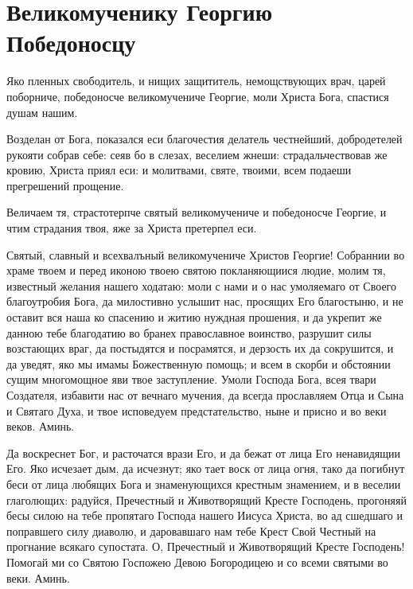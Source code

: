 \mychapterending{}


\section{Великомученику Георгию Победоносцу}\begin{mymulticols}
 
\ifpdf
  {\centering{}}
\else
\fi

Яко пленных свободитель, и нищих защититель, немощствующих врач, царей поборниче, победоносче великомучениче Георгие, моли Христа Бога, спастися душам нашим.


Возделан от Бога, показался еси благочестия делатель честнейший, добродетелей рукояти собрав себе: сеяв бо в слезах, веселием жнеши: страдальчествовав же кровию, Христа приял еси: и молитвами, святе, твоими, всем подаеши прегрешений прощение.


Величаем тя, страстотерпче святый великомучениче и победоносче Георгие, и чтим страдания твоя, яже за Христа претерпел еси.


Святый, славный и всехвалъный великомучениче Христов Георгие! Собраннии во храме твоем и перед иконою твоею святою покланяющиися людие, молим тя, известный желания нашего ходатаю: моли с нами и о нас умоляемаго от Своего благоутробия Бога, да милостивно услышит нас, просящих Его благостыню, и не оставит вся наша ко спасению и житию нуждная прошения, и да укрепит же данною тебе благодатию во бранех православное воинство, разрушит силы возстающих враг, да постыдятся и посрамятся, и дерзость их да сокрушится, и да уведят, яко мы имамы Божественную помощь; и всем в скорби и обстоянии сущим многомощное яви твое заступление. Умоли Господа Бога, всея твари Создателя, избавити нас от вечнаго мучения, да всегда прославляем Отца и Сына и Святаго Духа, и твое исповедуем предстательство, ныне и присно и во веки веков. Аминь.

Да воскреснет Бог, и расточатся врази Его, и да бежат от лица Его ненавидящии Его. Яко исчезает дым, да исчезнут; яко тает воск от лица огня, тако да погибнут беси от лица любящих Бога и знаменующихся крестным знамением, и в веселии глаголющих: радуйся, Пречестный и Животворящий Кресте Господень, прогоняяй бесы силою на тебе пропятаго Господа нашего Иисуса Христа, во ад сшедшаго и поправшего силу диаволю, и даровавшаго нам тебе Крест Свой Честный на прогнание всякаго супостата. О, Пречестный и Животворящий Кресте Господень! Помогай ми со Святою Госпожею Девою Богородицею и со всеми святыми во веки. Аминь.


\end{mymulticols}

